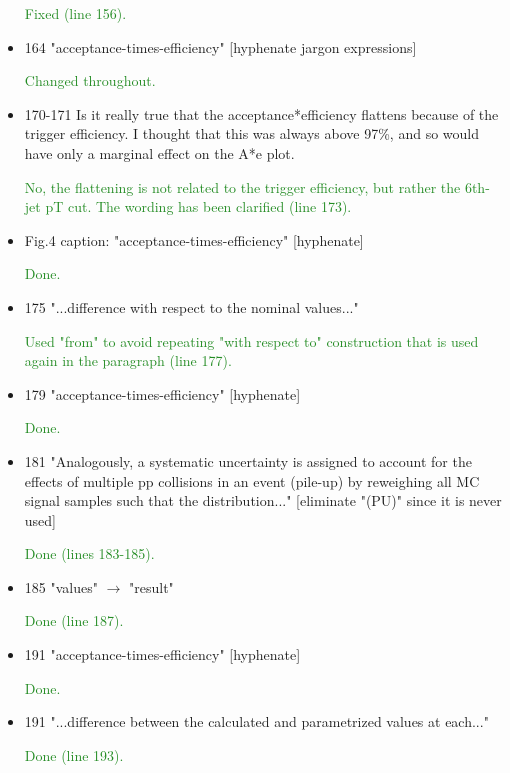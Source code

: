 \documentclass[paper=a4, fontsize=11pt]{scrartcl}
\begin{document}
\begin{itemize}
\textcolor{ForestGreen}{Fixed (line 156).}

\item 164 "acceptance-times-efficiency" [hyphenate jargon expressions]

\textcolor{ForestGreen}{Changed throughout.}

\item 170-171
Is it really true that the acceptance*efficiency flattens because of the
trigger efficiency. I thought that
this was always above 97\%, and so would have only a marginal effect on the
A*e plot.

\textcolor{ForestGreen}{No, the flattening is not related to the trigger efficiency, but rather
the 6th-jet pT cut. The wording has been clarified (line 173).}

\item Fig.4 caption: "acceptance-times-efficiency" [hyphenate]

\textcolor{ForestGreen}{Done.}

\item 175 "...difference with respect to the nominal values..."

\textcolor{ForestGreen}{Used "from" to avoid repeating "with respect to" construction that is
used again in the paragraph (line 177).}

\item 179 "acceptance-times-efficiency" [hyphenate]

\textcolor{ForestGreen}{Done.}

\item 181 "Analogously, a systematic uncertainty is assigned to account
 for the effects of multiple pp collisions in an event (pile-up)
 by reweighing all MC signal samples such that the distribution..."
 [eliminate "(PU)" since it is never used]
 
\textcolor{ForestGreen}{Done (lines 183-185).}

\item 185 "values" $\rightarrow$  "result"

\textcolor{ForestGreen}{Done (line 187).}

\item 191 "acceptance-times-efficiency" [hyphenate]

\textcolor{ForestGreen}{Done.}

\item 191 "...difference between the calculated and parametrized values
  at each..."
  
\textcolor{ForestGreen}{Done (line 193).}


\end{itemize}
\end{document}

